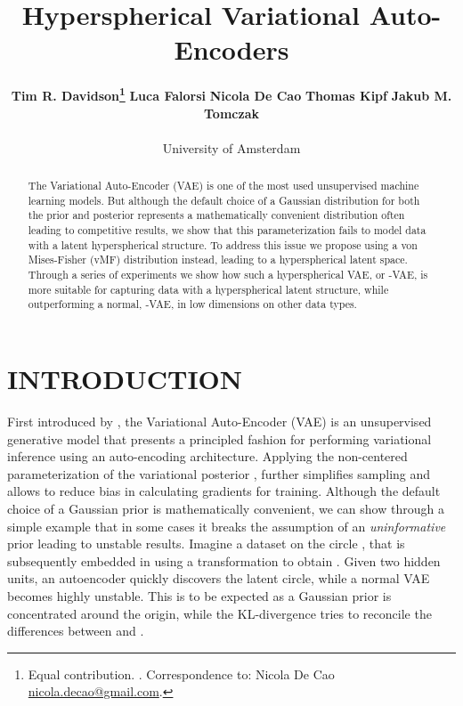 \documentclass[letterpaper]{article}
\title{Hyperspherical Variational Auto-Encoders}
\author{ {\bf Tim R. Davidson\thanks{\;\;Equal contribution. . Correspondence to: Nicola De Cao \href{mailto:nicola.decao@gmail.com}{nicola.decao@gmail.com}.}}
\quad
{\bf Luca Falorsi\footnotemark[1]}
\quad
{\bf Nicola De Cao\footnotemark[1]}
\quad
{\bf Thomas Kipf}
\quad
{\bf Jakub M. Tomczak}\\\\
University of Amsterdam
}
\begin{document}
\maketitle

\begin{abstract}
The Variational Auto-Encoder (VAE) is one of the most used unsupervised machine learning models. But although the default choice of a Gaussian distribution for both the prior and posterior represents a mathematically convenient distribution often leading to competitive results, we show that this parameterization fails to model data with a latent hyperspherical structure. To address this issue we propose using a von Mises-Fisher (vMF) distribution instead, leading to a hyperspherical latent space. Through a series of experiments we show how such a hyperspherical VAE, or  -VAE, is more suitable for capturing data with a hyperspherical latent structure, while outperforming a normal,  -VAE, in low dimensions on other data types.
\end{abstract}

\section{INTRODUCTION}

First introduced by \cite{journals/corr/KingmaW13, rezende2014stochastic}, the Variational Auto-Encoder (VAE) is an unsupervised generative model that presents a principled fashion for performing variational inference using an auto-encoding architecture. Applying the non-centered parameterization of the variational posterior \citep{KingmaWelling-2014-eff-gradient-inf}, further simplifies sampling and allows to reduce bias in calculating gradients for training. Although the default choice of a Gaussian prior is mathematically convenient, we can show through a simple example that in some cases it breaks the assumption of an \textit{uninformative} prior leading to unstable results. Imagine a dataset on the circle , that is subsequently embedded in  using a transformation  to obtain . Given two hidden units, an autoencoder quickly discovers the latent circle, while a normal VAE becomes highly unstable. This is to be expected as a Gaussian prior is concentrated around the origin, while the KL-divergence tries to reconcile the differences between  and . 
\end{document}

